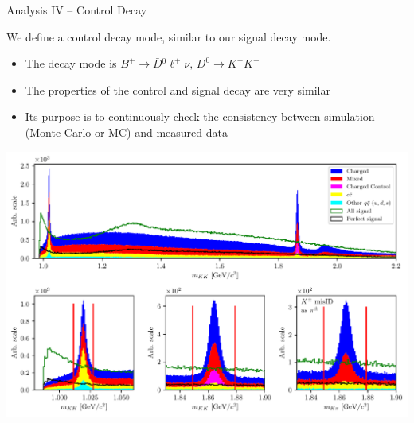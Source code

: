 \documentclass[serif]{beamer}
\begin{document}
\begin{frame}[t]{Analysis IV -- Control Decay}

\vspace{-3mm}
\small

\begin{block}{}
	We define a control decay mode, similar to our signal decay mode.
	\begin{itemize}
		\item The decay mode is $B^+ \to \bar D {}^0 \ell^+ \nu,\, D^0 \to K^+ K^-$
		\item The properties of the control and signal decay are very similar
		\item Its purpose is to continuously check the consistency between simulation (Monte Carlo or MC) and measured data
	\end{itemize}
\end{block}

\begin{center}
	\includegraphics[width=\textwidth, trim={0 6.5cm 0 0},clip]{fig/res_bkg}
\end{center}

\end{frame}


\end{document}
